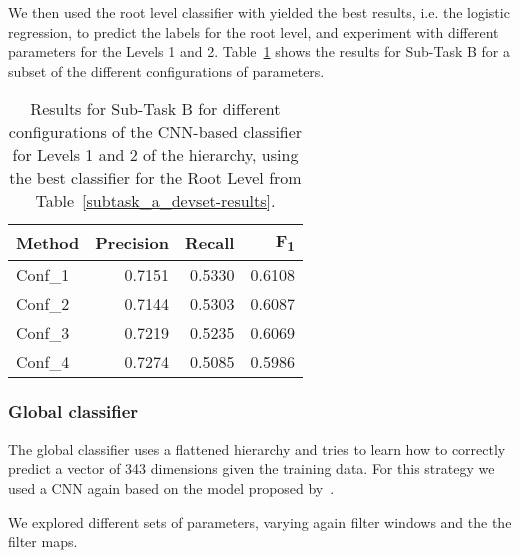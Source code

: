 \documentclass[11pt,a4paper]{article}
\begin{document}
We then used the root level classifier with yielded the best results, i.e. the
logistic regression, to predict the labels for the root level, and experiment
with different parameters for the Levels 1 and 2. Table~\ref{level-1-2} shows
the results for Sub-Task B for a subset of the different configurations of parameters.

\begin{table}[!h]
\begin{center}
\begin{tabular}{|l|r|r|r|}
\hline\centering\textbf{Method}  & \textbf{Precision} &  \textbf{Recall} &  \textbf{F\textsubscript{1}}\\
\hline
 Conf\_1 & 0.7151 & 0.5330 & 0.6108 \\
 Conf\_2 & 0.7144 & 0.5303 & 0.6087 \\
 Conf\_3 & 0.7219 & 0.5235 & 0.6069 \\
 Conf\_4 & 0.7274 & 0.5085 & 0.5986 \\
\hline
\end{tabular}
\end{center}
\caption{\label{level-1-2} Results for Sub-Task B for different configurations
of the CNN-based classifier for Levels 1 and 2 of the hierarchy, using the best
classifier for the Root Level from Table~\ref{subtask_a_devset-results}.}
\end{table}






\subsubsection{Global classifier}

The global classifier uses a flattened hierarchy and tries to learn how to correctly
predict a vector of 343 dimensions given the training data. For this strategy we
used a CNN again based on the model proposed by~.

We explored different sets of parameters, varying again filter windows and the
the filter maps.
\end{document}
